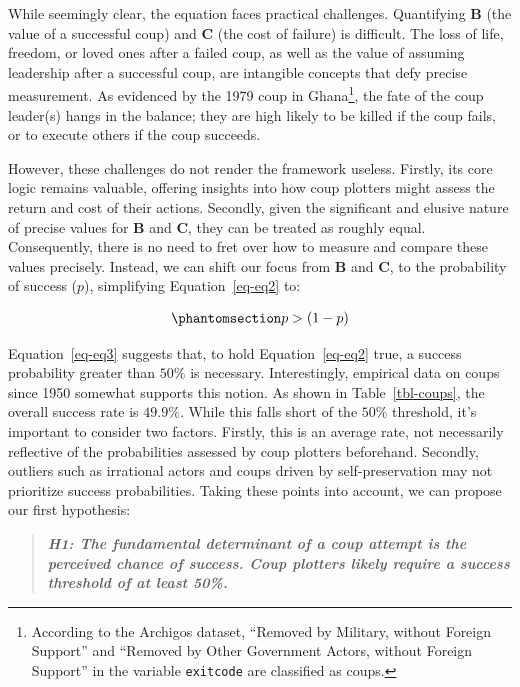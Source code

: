 \documentclass[
  12pt,
]{report}
\begin{document}
While seemingly clear, the equation faces practical challenges.
Quantifying \(\mathbf B\) (the value of a successful coup) and
\(\mathbf C\) (the cost of failure) is difficult. The loss of life,
freedom, or loved ones after a failed coup, as well as the value of
assuming leadership after a successful coup, are intangible concepts
that defy precise measurement. As evidenced by the 1979 coup in
Ghana\footnote{According to the Archigos dataset, ``Removed by Military,
  without Foreign Support'' and ``Removed by Other Government Actors,
  without Foreign Support'' in the variable \texttt{exitcode} are
  classified as coups.}, the fate of the coup leader(s) hangs in the
balance; they are high likely to be killed if the coup fails, or to
execute others if the coup succeeds.

However, these challenges do not render the framework useless. Firstly,
its core logic remains valuable, offering insights into how coup
plotters might assess the return and cost of their actions. Secondly,
given the significant and elusive nature of precise values for
\(\mathbf B\) and \(\mathbf C\), they can be treated as roughly equal.
Consequently, there is no need to fret over how to measure and compare
these values precisely. Instead, we can shift our focus from
\(\mathbf B\) and \(\mathbf C\), to the probability of success (\(p\)),
simplifying Equation~\ref{eq-eq2} to:

\begin{equation}\phantomsection\label{eq-eq3}{
\begin{aligned}
p > (1-p)
\end{aligned}
}\end{equation}

Equation~\ref{eq-eq3} suggests that, to hold Equation~\ref{eq-eq2} true,
a success probability greater than \(50\%\) is necessary. Interestingly,
empirical data on coups since 1950 somewhat supports this notion. As
shown in Table~\ref{tbl-coups}, the overall success rate is \(49.9\%\).
While this falls short of the \(50\%\) threshold, it's important to
consider two factors. Firstly, this is an average rate, not necessarily
reflective of the probabilities assessed by coup plotters beforehand.
Secondly, outliers such as irrational actors and coups driven by
self-preservation may not prioritize success probabilities. Taking these
points into account, we can propose our first hypothesis:

\begin{quote}
\textbf{\emph{H1: The fundamental determinant of a coup attempt is the
perceived chance of success. Coup plotters likely require a success
threshold of at least 50\%.}}
\end{quote}
\end{document}
